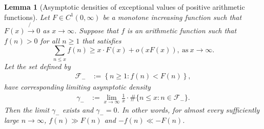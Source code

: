 \documentclass[11pt,reqno,a4letter]{article}
\numberwithin{figure}{section}
\numberwithin{table}{section}
\theoremstyle{plain}
\newtheorem{lemma}[theorem]{Lemma}
\numberwithin{theorem}{section}
\theoremstyle{definition}
\begin{document}
\begin{lemma}[Asymptotic densities of exceptional values of positive arithmetic functions] 
\label{lemma_AsymptoticDensitiesOfExceptionalSets_v1}
\label{remark_AsymptoticDensitiesOfExceptionalSets_v1}
Let $F \in C^{1}(0, \infty)$ be a monotone increasing function such that 
$F(x) \not{\rightarrow} 0$ as $x \rightarrow \infty$. 
Suppose that $f$ is an arithmetic function such that $f(n) > 0$ for all $n \geq 1$ that satisfies 
\[
\sum_{n \leq x} f(n) \geq x \cdot F(x) + o(xF(x)), \mathrm{\ as\ } x \rightarrow \infty. 
\]
Let the set defined by 
\begin{align*} 
\mathcal{F}_{-} & := \left\{n \geq 1: f(n) < F(n)\right\}, 
\end{align*} 
have corresponding limiting asymptotic density
\begin{align*} 
\gamma_{-} & := \lim_{x \rightarrow \infty} \frac{1}{x} \cdot \#\{n \leq x: n \in \mathcal{F}_{-}\}. 
\end{align*} 
Then the limit $\gamma_{-}$ exists and $\gamma_{-} = 0$. 
In other words, for almost every sufficiently large $n \rightarrow \infty$, 
$f(n) \gg F(n)$ and $-f(n) \ll -F(n)$. 
\end{lemma} 
\end{document}
